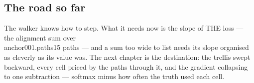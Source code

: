 \cleardoublepage
\begin{narrative}
\section*{The road so far}


\noindent The walker knows how to step. What it needs now is the slope of THE loss — the alignment sum over \\anchor{001.paths15} paths — and a sum too wide to list needs its slope organised as cleverly as its value was. The next chapter is the destination: the trellis swept backward, every cell priced by the paths through it, and the gradient collapsing to one subtraction — softmax minus how often the truth used each cell.
\end{narrative}

